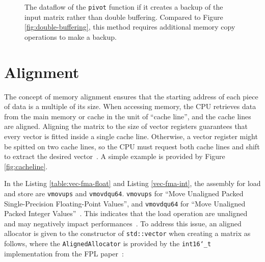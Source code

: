 \documentclass[logo,bsc,singlespacing,parskip]{infthesis}
\newcommand{\dtshort}{\texttt{int16\char`_t}}
\newcommand{\pivot}{\texttt{pivot}}
\begin{document}
\begin{figure}
\centering
{}
\caption{The dataflow of the \pivot{} function if it creates a backup of the input matrix rather than double buffering. Compared to Figure \ref{fig:double-buffering}, this method requires additional memory copy operations to make a backup.}
\label{fig:single-buffering}
\end{figure}


\section{Alignment}


The concept of memory alignment ensures that the starting address of each piece of data is a multiple of its size. When accessing memory, the CPU retrieves data from the main memory or cache in the unit of ``cache line'', and the cache lines are aligned. Aligning the matrix to the size of vector registers guarantees that every vector is fitted inside a single cache line. Otherwise, a vector register might be spitted on two cache lines, so the CPU must request both cache lines and shift to extract the desired vector~\cite{Unaligned}. A simple example is provided by Figure \ref{fig:cacheline}.


In the Listing \ref{table:vec-fma-float} and Listing \ref{vec-fma-int}, the assembly for load and store are \texttt{vmovups} and \texttt{vmovdqu64}. \texttt{vmovups} for ``Move Unaligned Packed Single-Precision Floating-Point Values'', and \texttt{vmovdqu64} for ``Move Unaligned Packed Integer Values''~\cite{instruction}. This indicates that the load operation are unaligned and may negatively impact performances~\cite{Unaligned}. To address this issue, an aligned allocator is given to the constructor of \texttt{std::vector} when creating a matrix as follows, where the \texttt{AlignedAllocator} is provided by the \dtshort{} implementation from the FPL paper~\cite{FPL2}:
\end{document}

